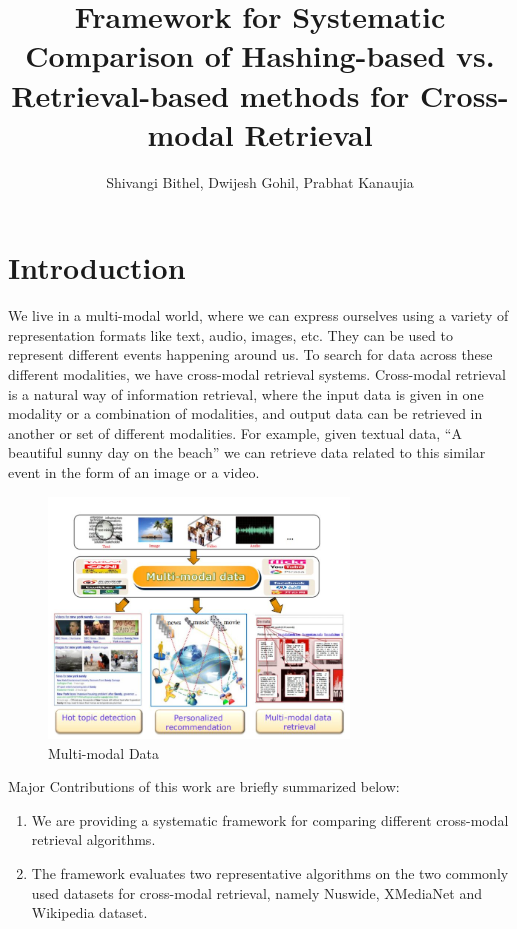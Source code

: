 \documentclass[10pt]{scrartcl}
\begin{document}
\title{Framework for Systematic Comparison of Hashing-based vs. Retrieval-based methods for Cross-modal Retrieval}
\author{Shivangi Bithel, Dwijesh Gohil, Prabhat Kanaujia}
\maketitle

\listoffigures
\section{Introduction}
We live in a multi-modal world, where we can express ourselves using a variety of representation formats like text, audio, images, etc. They can be used to represent different events happening around us. To search for data across these different modalities, we have cross-modal retrieval systems. Cross-modal retrieval is a natural way of information retrieval, where the input data is given in one modality or a combination of modalities, and output data can be retrieved in another or set of different modalities. For example, given textual data, “A beautiful sunny day on the beach” we can retrieve data related to this similar event in the form of an image or a video.
\begin{figure}
    \centering
    \includegraphics[width=8cm]{example1.JPG}
    \caption{Multi-modal Data}
\end{figure}

\newpage

Major Contributions of this work are briefly summarized below: 
\begin{enumerate}
    \item We are providing a systematic framework for comparing different cross-modal retrieval algorithms.
    \item The framework evaluates two representative algorithms on the two commonly used datasets for cross-modal retrieval, namely Nuswide, XMediaNet and Wikipedia dataset.
\end{enumerate}
\end{document}
